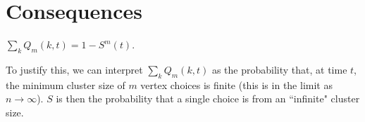\documentclass[twoside,10pt]{article}
\begin{document}

\section{Consequences}

\begin{prop}
	$\sum_{k} Q_{m}(k,t) = 1 - S^{m}(t)$.
\end{prop}
	To justify this, we can interpret $\sum_{k}Q_{m}(k, t)$ as the probability that, at time $t$, the minimum cluster size of $m$ vertex choices is finite (this is in the limit as $n\to \infty$). $S$ is then the probability that a single choice is from an ``infinite" cluster size. 
\end{document}
